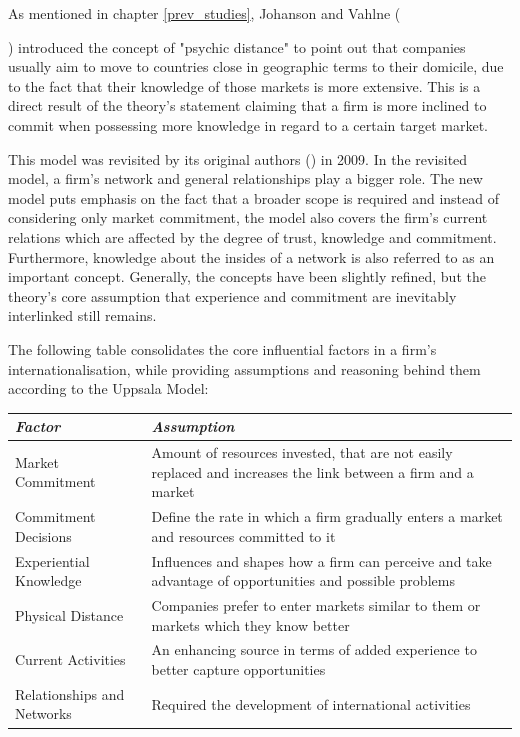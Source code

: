 \documentclass[11pt,a4paper]{article}
\begin{document}
As mentioned in chapter \ref{prev_studies}, Johanson and Vahlne ({\citeyear{johansonInternationalizationProcessFirm1977}) introduced the concept of "psychic distance" to point out that companies usually aim to move to countries close in geographic terms to their domicile, due to the fact that their knowledge of those markets is more extensive. This is a direct result of the theory's statement claiming that a firm is more inclined to commit when possessing more knowledge in regard to a certain target market. \par
This model was revisited by its original authors (\citeauthor{johansonUppsalaInternationalizationProcess2009}) in 2009. In the revisited model, a firm's network and general relationships play a bigger role. The new model puts emphasis on the fact that a broader scope is required and instead of considering only market commitment, the model also covers the firm's current relations which are affected by the degree of trust, knowledge and commitment. Furthermore, knowledge about the insides of a network is also referred to as an important concept. Generally, the concepts have been slightly refined, but the theory's core assumption that experience and commitment are inevitably interlinked still remains. \par
The following table consolidates the core influential factors in a firm's internationalisation, while providing assumptions and reasoning behind them according to the Uppsala Model:

\vspace{8mm}
\begin{table}[H] \centering 
\begin{tabular}{P{5cm}P{10cm}}
  \toprule
  \emph{Factor} & \emph{Assumption}  \\ 
    \midrule
  Market Commitment & Amount of resources invested, that are not easily replaced and increases the link between a firm and a market \\
                  Commitment Decisions & Define the rate in which a firm gradually enters a market and resources committed to it \\
    Experiential Knowledge & Influences and shapes how a firm can perceive and take advantage of opportunities and possible problems \\
        Physical Distance & Companies prefer to enter markets similar to them or markets which they know better \\
                Current Activities & An enhancing source in terms of added experience to better capture opportunities \\
                Relationships and Networks & Required the development of international activities \\
              

\end{tabular}
\end{table}}
\end{document}
